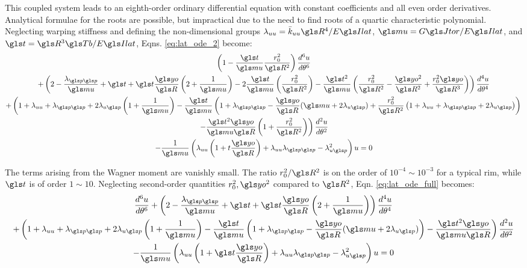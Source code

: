 \documentclass[\rootdir/thesis.tex]{subfiles}
\begin{document}
This coupled system leads to an eighth-order ordinary differential equation with constant coefficients and all even order derivatives. Analytical formulae for the roots are possible, but impractical due to the need to find roots of a quartic characteristic polynomial. Neglecting warping stiffness and defining the non-dimensional groups $\lr_{uu}=\kuu \R^4/\EIl$, $\m=\GJ/\EIl$, and $\ts=\R^3\Tb/\EIl$, Eqns. \eqref{eq:lat_ode_2} become:
\begin{multline}
\label{eq:lat_ode_full}
  \left(1 - \frac{\ts}{\m}\frac{\ro^2}{\R^2}\right)\dt{u}{6}\\
  +\left(2 - \frac{\lr_{\p\p}}{\m} + \ts + \ts\frac{\yo}{\R}\left(2 + \frac{1}{\m}\right)
         -2\frac{\ts}{\m}\left(\frac{\ro^2}{\R^2}\right)
         -\frac{\ts^2}{\m}\left(\frac{\ro^2}{\R^2} - \frac{\yo^2}{\R^2} +
                               \frac{\ro^2\yo}{\R^3}\right) \right) \dt{u}{4}\\
  +\left(1 + \lr_{uu} + \lr_{\p\p} + 2\lr_{u\p}\left(1+\frac{1}{\m}\right)
         -\frac{\ts}{\m}\left(1 + \lr_{\p\p}
                             -\frac{\yo}{\R}(\m + 2\lr_{u\p})
                             +\frac{\ro^2}{\R^2}\left(1 + \lr_{uu} + \lr_{\p\p} + 2\lr_{u\p}\right)\right)\right.\\
         \left.-\frac{\ts^2\yo}{\m \R}\left(1 + \frac{\ro^2}{\R^2}\right)\right)\dt{u}{2}\\
  -\frac{1}{\m}\left(\lr_{uu}\left(1+t\frac{\yo}{\R}\right)
                      +\lr_{uu}\lr_{\p\p} - \lr_{u\p}^2\right)u = 0
\end{multline}

The terms arising from the Wagner moment are vanishly small. The ratio $\ro^2/\R^2$ is on the order of $10^{-4}\sim10^{-3}$ for a typical rim, while $\ts$ is of order $1\sim10$. Neglecting second-order quantities $\ro^2,\yo^2$ compared to $\R^2$, Eqn. \eqref{eq:lat_ode_full} becomes:
\begin{multline}
\label{eq:lat_ode}
  \dt{u}{6}
  +\left(2 - \frac{\lr_{\p\p}}{\m} + \ts + \ts\frac{\yo}{\R}\left(2 + \frac{1}{\m}\right)
         \right) \dt{u}{4}\\
  +\left(1 + \lr_{uu} + \lr_{\p\p} + 2\lr_{u\p}\left(1+\frac{1}{\m}\right)
         -\frac{\ts}{\m}\left(1 + \lr_{\p\p}
                             -\frac{\yo}{\R}(\m + 2\lr_{u\p})
                             \right)
         -\frac{\ts^2\yo}{\m \R}\right)\dt{u}{2}\\
  -\frac{1}{\m}\left(\lr_{uu}\left(1+\ts\frac{\yo}{\R}\right)
                      +\lr_{uu}\lr_{\p\p} - \lr_{u\p}^2\right)u = 0
\end{multline}
\end{document}

